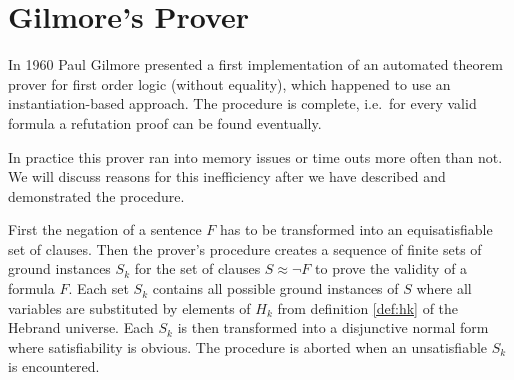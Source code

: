 
\section{Gilmore's Prover}\label{sec:gilmore:prover}

In 1960 Paul Gilmore presented a first {\myem implementation} of an automated
theorem prover \cite{5392528} for first order logic (without equality),
which happened to use an instantiation-based approach.
The procedure is complete, i.e.~for every valid formula
a refutation proof can be found eventually.

In practice this prover ran into memory issues or time outs more often than not.
We will discuss reasons for this inefficiency after we have described and demonstrated the procedure.

First the negation of a sentence $F$ has to be transformed into an equisatisfiable set of clauses.
Then the prover's procedure
creates a sequence of finite sets of ground instances $S_k$
for the set of clauses $S\approx\lnot F$ to prove the validity of a formula $F$.
Each set $S_k$ contains all possible ground instances of $S$
where all variables are substituted by elements of $H_k$
from definition \ref{def:hk} of the Hebrand universe.
Each $S_k$ is then transformed into a disjunctive normal form where satisfiability is obvious.
The procedure is aborted when an unsatisfiable $S_k$ is encountered.

